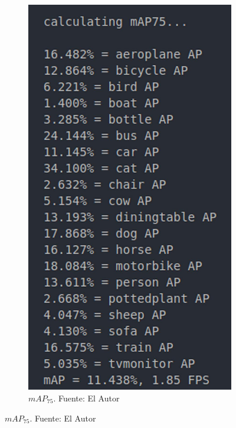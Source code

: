 \begin{figure}[H]
\begin{subfigure}[b]{0.4\textwidth}
        \label{mAP_50_result}
     \end{subfigure}
     \hfill
     \begin{subfigure}[b]{0.4\textwidth}
         \centering
        \includegraphics[scale=0.15]{Recursos/mAP75_result.jpg}
        \caption[$mAP_{75}$.]{$mAP_{75}$. {\footnotesize Fuente: El Autor}}
        \label{mAP_75_result}

\end{subfigure}
\end{figure}
